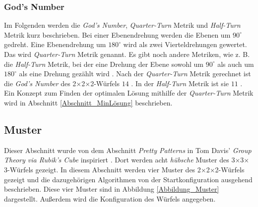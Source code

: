 \documentclass[12pt,a4paper, usenames, dvipsnames]{article}
\theoremstyle{mystyle}
\theoremstyle{definition}
\newcommand{\Ttwo}{2$\times$2$\times$2-}
\newcommand{\Tthree}{3$\times$3$\times$3-}
\begin{document}
\subsubsection*{God's Number}
Im Folgenden werden die \textit{God's Number}, \textit{Quarter-Turn} Metrik und \textit{Half-Turn} Metrik kurz beschrieben.
Bei einer Ebenendrehung werden die Ebenen um $90^\circ$ gedreht. Eine Ebenendrehung um $180^\circ$ wird als zwei Vierteldrehungen gewertet. Das wird \textit{Quarter-Turn} Metrik genannt. Es gibt noch andere Metriken, wie z. B. die \textit{Half-Turn} Metrik, bei der eine Drehung der Ebene sowohl um $90^\circ$ als auch um $180^\circ$ als eine Drehung gezählt wird \cite{TR}.
Nach der \textit{Quarter-Turn} Metrik gerechnet ist die \textit{God's Number} des \Ttwo Würfels $14$ \cite{DJ}. In der \textit{Half-Turn} Metrik ist sie $11$ \cite{RMG}.
Ein Konzept zum Finden der optimalen Lösung mithilfe der \textit{Quarter-Turn} Metrik wird in Abschnitt \ref{Abschnitt_MinLösung} beschrieben.


%
%
%
%
%
%
%
%
%
%
%
%
%
%
%
%
%
%
%
\subsection{Muster}

Dieser Abschnitt wurde von dem Abschnitt \textit{Pretty Patterns} in Tom Davis' \textit{Group Theory via Rubik's Cube} inspiriert \cite{TD}.
Dort werden acht \textit{hübsche} Muster des \Tthree Würfels gezeigt. In diesem Abschnitt werden vier Muster des \Ttwo Würfels gezeigt und die dazugehörigen Algorithmen von der Startkonfiguration ausgehend beschrieben. Diese vier Muster sind in Abbildung \ref{Abbildung_Muster} dargestellt.
Außerdem wird die Konfiguration des Würfels angegeben.
\end{document}
